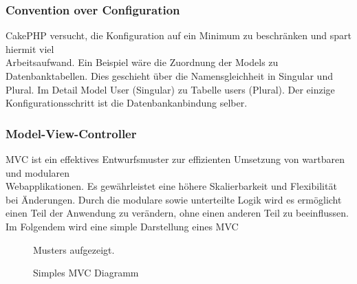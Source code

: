\subsubsection{Convention over Configuration}
\label{sec:CoC}
CakePHP versucht, die Konfiguration auf ein Minimum zu beschränken und
spart hiermit viel \\ Arbeitsaufwand. Ein Beispiel wäre die Zuordnung der Models
zu Datenbanktabellen. Dies geschieht über die Namensgleichheit in Singular und Plural. 
Im Detail Model User (Singular) zu Tabelle users (Plural). Der einzige
Konfigurationsschritt ist die Datenbankanbindung selber.


\subsubsection{Model-View-Controller}
\label{sec:MVC}
\ac{MVC} ist ein effektives Entwurfsmuster zur effizienten Umsetzung von 
wartbaren und modularen \\ Webapplikationen. Es gewährleistet eine höhere
Skalierbarkeit und Flexibilität bei Änderungen. Durch die modulare sowie
unterteilte Logik wird es ermöglicht einen Teil der Anwendung zu
verändern, ohne einen anderen Teil zu beeinflussen. Im Folgendem wird eine
simple Darstellung eines \ac{MVC} \begin{figure}[htb] Musters aufgezeigt.
\label{MVC-Diagramm}
\caption{Simples MVC Diagramm}
\end{figure}

